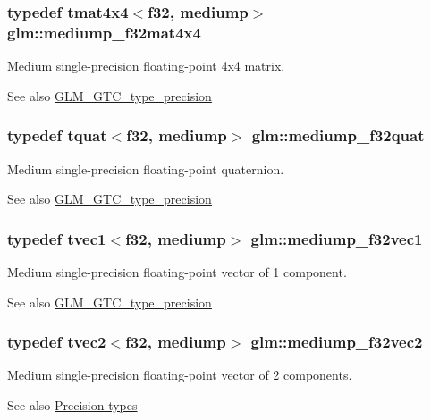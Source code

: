 \subsubsection[{mediump\+\_\+f32mat4x4}]{\setlength{\rightskip}{0pt plus 5cm}typedef tmat4x4$<${\bf f32}, mediump$>$ {\bf glm\+::mediump\+\_\+f32mat4x4}}\label{namespaceglm_a3c3a55da431fd8deef6a4ce3bb3bda99}
Medium single-\/precision floating-\/point 4x4 matrix. \begin{DoxySeeAlso}{See also}
\hyperlink{group__gtc__type__precision}{G\+L\+M\+\_\+\+G\+T\+C\+\_\+type\+\_\+precision} 
\end{DoxySeeAlso}
\hypertarget{namespaceglm_a17ccbdb3f59a9a3de48a15d1445fd1ce}{}
\subsubsection[{mediump\+\_\+f32quat}]{\setlength{\rightskip}{0pt plus 5cm}typedef {\bf tquat}$<${\bf f32}, mediump$>$ {\bf glm\+::mediump\+\_\+f32quat}}\label{namespaceglm_a17ccbdb3f59a9a3de48a15d1445fd1ce}
Medium single-\/precision floating-\/point quaternion. \begin{DoxySeeAlso}{See also}
\hyperlink{group__gtc__type__precision}{G\+L\+M\+\_\+\+G\+T\+C\+\_\+type\+\_\+precision} 
\end{DoxySeeAlso}
\hypertarget{namespaceglm_a4894402299b6c47131fb40ed6dbcbfd0}{}
\subsubsection[{mediump\+\_\+f32vec1}]{\setlength{\rightskip}{0pt plus 5cm}typedef tvec1$<${\bf f32}, mediump$>$ {\bf glm\+::mediump\+\_\+f32vec1}}\label{namespaceglm_a4894402299b6c47131fb40ed6dbcbfd0}
Medium single-\/precision floating-\/point vector of 1 component. \begin{DoxySeeAlso}{See also}
\hyperlink{group__gtc__type__precision}{G\+L\+M\+\_\+\+G\+T\+C\+\_\+type\+\_\+precision} 
\end{DoxySeeAlso}
\hypertarget{namespaceglm_ad9295a48381e62085e37416504b11932}{}
\subsubsection[{mediump\+\_\+f32vec2}]{\setlength{\rightskip}{0pt plus 5cm}typedef tvec2$<${\bf f32}, mediump$>$ {\bf glm\+::mediump\+\_\+f32vec2}}\label{namespaceglm_ad9295a48381e62085e37416504b11932}
Medium single-\/precision floating-\/point vector of 2 components. \begin{DoxySeeAlso}{See also}
\hyperlink{group__core__precision}{Precision types} 
\end{DoxySeeAlso}
\hypertarget{namespaceglm_a847e98e715459420de18bff43cbc49f6}{}
